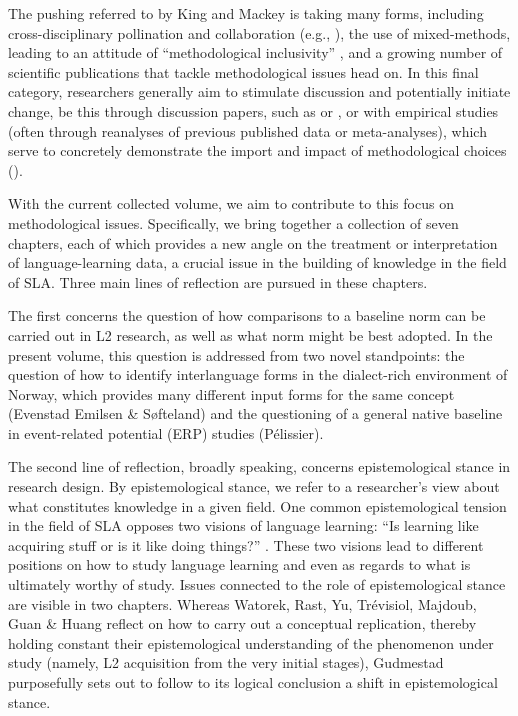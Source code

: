 \documentclass[output=paper]{../langscibook}
\begin{document}
The pushing referred to by King and Mackey is taking many forms, including cross-disciplinary pollination and collaboration (e.g., \citealt{DuffByrnes2019}), the use of mixed-methods, leading to an attitude of {“methodological inclusivity” \citep[478]{Römer2019}, and a growing number of scientific publications that tackle methodological issues head on. In this final category, researchers generally aim to stimulate discussion and potentially initiate change, be this through discussion papers, such as \citet{TheDouglasFirGroup2016} or \citet{Young2018}, or with empirical studies (often through reanalyses of previous published data or meta-analyses), which serve to concretely demonstrate the import and impact of methodological choices (\citealt{SantosEtAl2008,LeeserSunderman2016,EdmondsGudmestad2018,Solon2018}).}


{With the current collected volume, we aim to contribute to this focus on methodological issues. Specifically, we bring together a collection of seven chapters, each of which} provides a new angle on the treatment or interpretation of lang\-uage-learning data, a crucial issue in the building of knowledge in the field of SLA. {Three main lines of reflection are pursued in these chapters.}



{The first concerns the question of how comparisons to a baseline norm can be carried out in L2 research, as well as what norm might be best adopted. In the present volume, this question is addressed from two novel standpoints: the question of how to identify interlanguage forms in the dialect-rich environment of Norway, which provides many different input forms for the same concept (}{{Evenstad Emilsen \& Søfteland}}{) and the questioning of a general native baseline in event-related potential (ERP) studies (Pélissier).}



{The second line of reflection, broadly speaking, concerns epistemological stance in research design. By epistemological stance, we refer to a researcher’s view about what constitutes knowledge in a given field. One common epistemological tension in the field of SLA opposes two visions of language learning: “}Is learning like acquiring stuff or is it like doing things?” \citep[45]{Young2018}. These two visions lead to different positions on how to study language learning and even as regards to what is ultimately worthy of study. {Issues connected to the role of epistemological stance are visible in two chapters. Whereas Watorek, Rast, Yu, Trévisiol, Majdoub, Guan \& Huang reflect on how to carry out a conceptual replication, thereby holding constant their epistemological understanding of the phenomenon under study (namely, L2 acquisition from the very initial stages), Gudmestad purposefully sets out to follow to its logical conclusion a shift in epistemological stance.}
\end{document}
